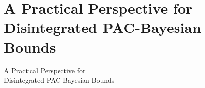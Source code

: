 \documentclass{slides}
\begin{document}

\section{A Practical Perspective for Disintegrated PAC-Bayesian Bounds}
\begin{xtitle}

\vspace{3cm}

{\huge A Practical Perspective for\\ Disintegrated PAC-Bayesian Bounds}\\

\vspace{3.5cm}

\end{xtitle}

\end{document}
